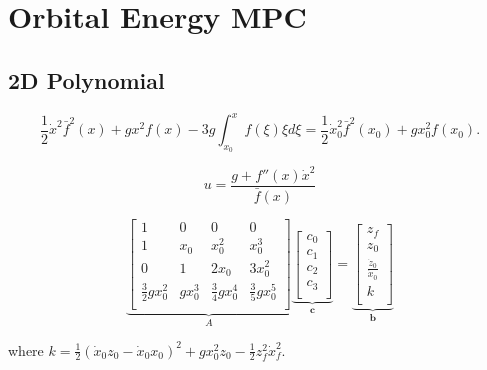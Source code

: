 %
\chapter{Orbital Energy MPC}

\section{2D Polynomial}
\begin{equation}
    \frac{1}{2}\dot{x}^2\bar{f}^2(x)+gx^2f(x) - 3g\int_{x_0}^xf(\xi)\xi d\xi = \frac{1}{2}\dot{x}_0^2\bar{f}^2(x_0)+gx_0^2f(x_0).
\end{equation}

\begin{equation}
    u = \frac{g + f''(x)\dot{x}^2}{\bar{f}(x)}
\end{equation}

\begin{equation}
    \underbrace{\begin{bmatrix}1 & 0 & 0 & 0 \\ 
     1 & x_0 & x_0^2 & x_0^3\\
     0 & 1 & 2x_0 & 3x_0^2\\
     \frac{3}{2}gx_0^2 & gx_0^3 & \frac{3}{4}gx_0^4 & \frac{3}{5}gx_0^5\\
     \end{bmatrix}}_A
     \underbrace{\begin{bmatrix}
     c_0\\
     c_1\\
     c_2\\
     c_3\\
     \end{bmatrix}}_{\boldsymbol{c}}=
     \underbrace{\begin{bmatrix}
     z_f\\
     z_0\\
     \frac{\dot{z}_0}{\dot{x}_0}\\
     k\\
     \end{bmatrix}}_{\boldsymbol{b}}
\end{equation}

where $k=\frac{1}{2}(\dot{x}_0z_0-\dot{x}_0x_0)^2 + gx_0^2z_0 - \frac{1}{2}z_f^2\dot{x}_f^2$.

